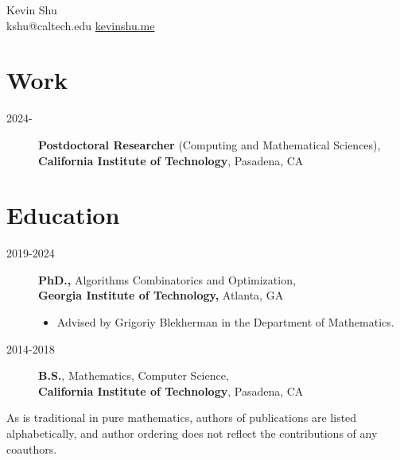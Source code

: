 \documentclass[10pt, letterpaper]{article}
\newenvironment{header}{
    \setlength{\topsep}{0pt}\par\kern\topsep\centering\linespread{1.5}
}{
    \par\kern\topsep
} %
\let\hrefWithoutArrow\href
\begin{document}
    \newcommand{\AND}{\unskip
        \cleaders\copy\ANDbox\hskip\wd\ANDbox
        \ignorespaces
    }
    \newsavebox\ANDbox
    \sbox\ANDbox{$|$}

    \begin{header}
        \fontsize{25 pt}{25 pt}\selectfont Kevin Shu\\
        \vspace{5 pt}
        \normalsize
        \mbox{kshu@caltech.edu} \hspace{5 pt}%
        \mbox{\hrefWithoutArrow{https://kevinshu.me}{kevinshu.me}}%
    \end{header}
\section{Work}
\begin{description}
    \item[2024-\qquad] {\bf Postdoctoral Researcher} (Computing and Mathematical Sciences),\\ {\hspace{0.35in} \bf California Institute of Technology}, Pasadena, CA
\end{description}
\section{Education} 
\begin{description}
    \item[2019-2024] {\bf PhD.,} Algorithms Combinatorics and Optimization,\\
        \hspace{0.35in} {\bf Georgia Institute of Technology,} Atlanta, GA
 
 \begin{itemize} \itemsep -2pt  %
 \item Advised by Grigoriy Blekherman in the Department of Mathematics.
 \end{itemize}

    \item[2014-2018] {\bf B.S.}, Mathematics, Computer Science,
\\ \hspace{0.35in} {\bf California Institute of Technology}, Pasadena, CA
\end{description}

As is traditional in pure mathematics, authors of publications are listed alphabetically, and author ordering does not reflect the contributions of any coauthors.
\end{document}
